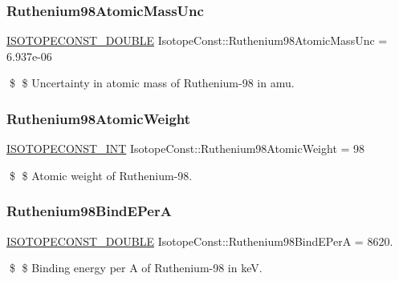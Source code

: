 \subsubsection{\texorpdfstring{Ruthenium98\+Atomic\+Mass\+Unc}{Ruthenium98AtomicMassUnc}}
{\footnotesize\ttfamily \mbox{\hyperlink{group___isotope_const-_macros_ga8f45a7272ce02c0b4c65c44636ed719a}{I\+S\+O\+T\+O\+P\+E\+C\+O\+N\+S\+T\+\_\+\+D\+O\+U\+B\+LE}} Isotope\+Const\+::\+Ruthenium98\+Atomic\+Mass\+Unc = 6.\+937e-\/06}

\$ \$ Uncertainty in atomic mass of Ruthenium-\/98 in amu. \mbox{\label{group___isotope_const-_ruthenium-_ru98_ga6ab617b6efd5e6867579bf9c3e418898}} 
\subsubsection{\texorpdfstring{Ruthenium98\+Atomic\+Weight}{Ruthenium98AtomicWeight}}
{\footnotesize\ttfamily \mbox{\hyperlink{group___isotope_const-_macros_ga5f18360b3e99483a35c32d789e62621c}{I\+S\+O\+T\+O\+P\+E\+C\+O\+N\+S\+T\+\_\+\+I\+NT}} Isotope\+Const\+::\+Ruthenium98\+Atomic\+Weight = 98}

\$ \$ Atomic weight of Ruthenium-\/98. \mbox{\label{group___isotope_const-_ruthenium-_ru98_ga879978bb644482b84d5e33893c195bae}} 
\subsubsection{\texorpdfstring{Ruthenium98\+Bind\+E\+PerA}{Ruthenium98BindEPerA}}
{\footnotesize\ttfamily \mbox{\hyperlink{group___isotope_const-_macros_ga8f45a7272ce02c0b4c65c44636ed719a}{I\+S\+O\+T\+O\+P\+E\+C\+O\+N\+S\+T\+\_\+\+D\+O\+U\+B\+LE}} Isotope\+Const\+::\+Ruthenium98\+Bind\+E\+PerA = 8620.}

\$ \$ Binding energy per A of Ruthenium-\/98 in keV. \mbox{\label{group___isotope_const-_ruthenium-_ru98_ga21f68d59c19bd08210de75f348cd003b}} 
